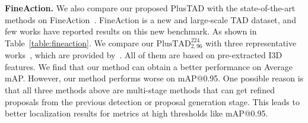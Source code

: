 \documentclass[a4paper,fleqn]{cas-dc}
\begin{document}
\begin{table*}[t]
\centering
\small
\caption{\textbf{Comparison with state of the art on the ActivityNet-1.3 dataset.} ``RGB-Only" means whether to use other input modalities besides RGB input. }
\setlength\tabcolsep{4.45mm}
\label{table:anet}
\end{table*}


\textbf{FineAction.}
We also compare our proposed PlusTAD with the state-of-the-art methods on FineAction~\citep{fineaction}. FineAction is a new and large-scale TAD dataset, and few works have reported results on this new benchmark.
As shown in Table~\ref{table:fineaction}. 
We compare our $\text{PlusTAD}_{2,96}^{224}$ with three representative works~\citep{bmn,dbg,g-tad}, which are provided by~\citep{fineaction}. All of them are based on pre-extracted I3D features. We find that our method can obtain a better performance on Average mAP. 
However, our method performs worse on mAP@0.95. 
One possible reason is that all three methods above are multi-stage methods that can get refined proposals from the previous detection or proposal generation stage. This leads to better localization results for metrics at high thresholds like mAP@0.95.
\end{document}
